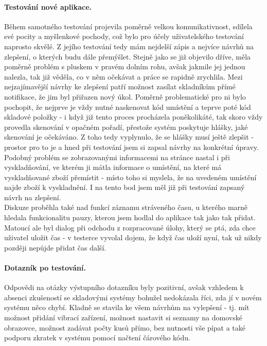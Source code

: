 \paragraph{Testování nové aplikace.} Během samotného testování projevila poměrně velkou komunikativnost, sdílela své pocity a myšlenkové pochody, což bylo pro účely uživatelského testování naprosto skvělé. Z jejího testování tedy mám nejdelší zápis a nejvíce návrhů na zlepšení, o kterých budu dále přemýšlet. Stejně jako se již objevilo dříve, měla poměrně problém s pluskem v pravém dolním rohu, avšak jakmile jej jednou nalezla, tak již věděla, co v něm očekávat a práce se rapidně zrychlila. Mezi nejzajímavější návrhy ke zlepšení patří možnost zasílat skladníkům přímé notifikace, že jim byl přiřazen nový úkol. Poměrně problematické pro ni bylo pochopit, že nejprve je vždy nutné naskenovat kód umístění a teprve poté kód skladové položky - i když již tento proces procházela poněkolikáté, tak skoro vždy provedla skenování v opačném pořadí, přestože systém poskytuje hlášky, jaké skenování je očekáváno. Z toho tedy vyplynulo, že se hlášky musí ještě zlepšit - prostor pro to je a hned při testování jsem si zapsal návrhy na konkrétní úpravy. Podobný problém se zobrazovanými informacemi na stránce nastal i při vyskladňování, ve kterém ji mátla informace o umístění, na které má vyskladňované zboží přemístit - místo toho si myslela, že na uvedeném umístění najde zboží k vyskladnění. I na tento bod jsem měl již při testování zapsaný návrh na zlepšení.\\
Diskuze proběhla také nad funkcí záznamu stráveného času, u kterého marně hledala funkcionalitu pauzy, kterou jsem hodlal do aplikace tak jako tak přidat. Matoucí ale byl dialog při odchodu z rozpracované úlohy, který se ptá, zda chce uživatel uložit čas - v testerce vyvolal dojem, že když čas uloží nyní, tak už nikdy později nepůjde přidat čas další. 

\paragraph{Dotazník po testování.} Odpovědi na otázky výstupního dotazníku byly pozitivní, avšak vzhledem k absenci zkušeností se skladovými systémy bohužel nedokázala říci, zda jí v novém systému něco chybí. Kladně se stavila ke všem návrhům na vylepšení - tj. mít možnost přidání vibrací zařízení, možnost nastavit si seznamy na domovské obrazovce, možnost zadávat počty kusů přímo, bez nutnosti vše pípat a také podporu zkratek v systému pomocí načtení čárového kódu.

